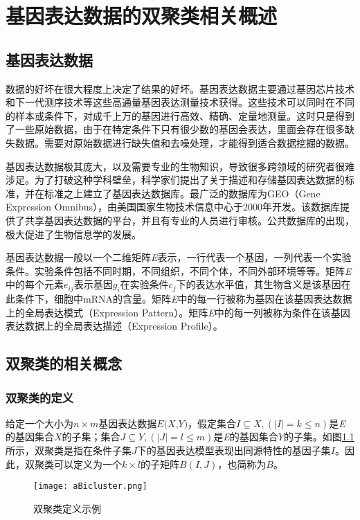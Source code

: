 \chapter{基因表达数据的双聚类相关概述}

\section{基因表达数据}
  数据的好坏在很大程度上决定了结果的好坏。基因表达数据主要通过基因芯片技术和下一代测序技术等这些高通量基因表达测量技术获得。这些技术可以同时在不同的样本或条件下，对成千上万的基因进行高效、精确、定量地测量。这时只是得到了一些原始数据，由于在特定条件下只有很少数的基因会表达，里面会存在很多缺失数据。需要对原始数据进行缺失值和去噪处理，才能得到适合数据挖掘的数据。

  基因表达数据极其庞大，以及需要专业的生物知识，导致很多跨领域的研究者很难涉足。为了打破这种学科壁垒，科学家们提出了关于描述和存储基因表达数据的标准，并在标准之上建立了基因表达数据库。最广泛的数据库为GEO（Gene Expression Omnibus），由美国国家生物技术信息中心于2000年开发。该数据库提供了共享基因表达数据的平台，并且有专业的人员进行审核。公共数据库的出现，极大促进了生物信息学的发展。

  基因表达数据一般以一个二维矩阵\textit{E}表示，一行代表一个基因，一列代表一个实验条件。实验条件包括不同时期，不同组织，不同个体，不同外部环境等等。矩阵\textit{E}中的每个元素$e_{ij} $表示基因$g_i$在实验条件$c_j$下的表达水平值，其生物含义是该基因在此条件下，细胞中mRNA的含量。矩阵\textit{E}中的每一行被称为基因在该基因表达数据上的全局表达模式（Expression Pattern）。矩阵\textit{E}中的每一列被称为条件在该基因表达数据上的全局表达描述（Expression Profile）。

\section{双聚类的相关概念}

  \subsection{双聚类的定义}
  给定一个大小为$n\times m$基因表达数据$\textit{E(X,Y)}$，假定集合$I\subseteq X,(|I| = k \leq n)$是\textit{E}的基因集合$X$的子集；集合$J\subseteq Y,(|J| = l \leq m)$是\textit{E}的基因集合$Y$的子集。如图\ref{fig:define_bic}所示，双聚类是指在条件子集$J$下的基因表达模型表现出同源特性的基因子集$I$。因此，双聚类可以定义为一个$k \times l$的子矩阵$B(I, J)$，也简称为$B$。
  \begin{figure}[htbp]
      \centering
  \texttt{[image: aBicluster.png]}
  \caption{双聚类定义示例}
  \label{fig:define_bic}
  \end{figure}

